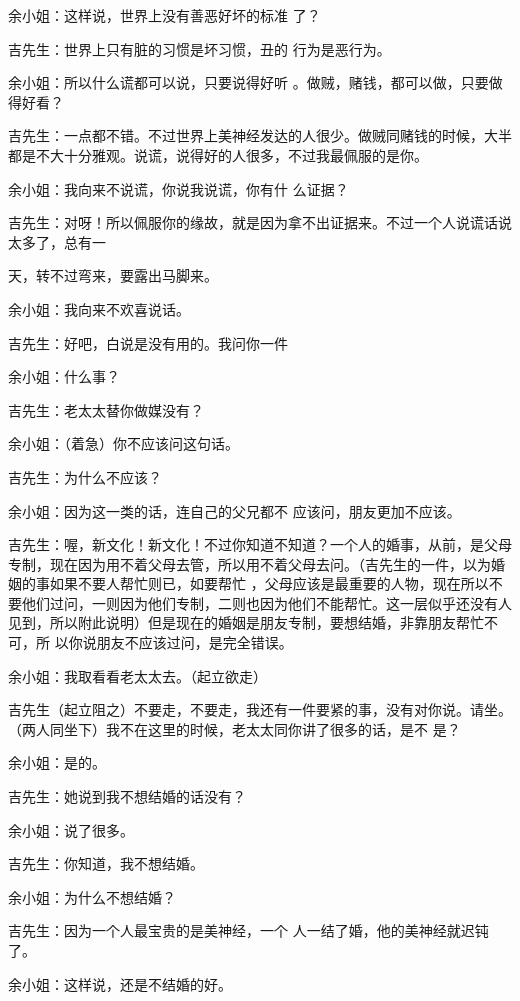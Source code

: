 \documentclass{article}
\begin{document}
余小姐：这样说，世界上没有善恶好坏的标准
了？ 

吉先生：世界上只有脏的习惯是坏习惯，丑的
行为是恶行为。 

余小姐：所以什么谎都可以说，只要说得好听
。做贼，赌钱，都可以做，只要做得好看？ 

吉先生：一点都不错。不过世界上美神经发达的人很少。做贼同赌钱的时候，大半都是不大十分雅观。说谎，说得好的人很多，不过我最佩服的是你。

余小姐：我向来不说谎，你说我说谎，你有什
么证据？ 

吉先生：对呀！所以佩服你的缘故，就是因为拿不出证据来。不过一个人说谎话说太多了，总有一
\newpage

天，转不过弯来，要露出马脚来。 


余小姐：我向来不欢喜说话。 

吉先生：好吧，白说是没有用的。我问你一件


余小姐：什么事？ 


吉先生：老太太替你做媒没有？ 


余小姐：（着急）你不应该问这句话。 


吉先生：为什么不应该？ 

余小姐：因为这一类的话，连自己的父兄都不
应该问，朋友更加不应该。 

吉先生：喔，新文化！新文化！不过你知道不知道？一个人的婚事，从前，是父母专制，现在因为用不着父母去管，所以用不着父母去问。（吉先生的一件，以为婚姻的事如果不要人帮忙则已，如要帮忙
\newpage
，父母应该是最重要的人物，现在所以不要他们过问，一则因为他们专制，二则也因为他们不能帮忙。这一层似乎还没有人见到，所以附此说明）但是现在的婚姻是朋友专制，要想结婚，非靠朋友帮忙不可，所
以你说朋友不应该过问，是完全错误。 


余小姐：我取看看老太太去。（起立欲走） 

吉先生（起立阻之）不要走，不要走，我还有一件要紧的事，没有对你说。请坐。（两人同坐下）我不在这里的时候，老太太同你讲了很多的话，是不
是？ 


余小姐：是的。 


吉先生：她说到我不想结婚的话没有？ 


余小姐：说了很多。 


吉先生：你知道，我不想结婚。 

\newpage


余小姐：为什么不想结婚？ 

吉先生：因为一个人最宝贵的是美神经，一个
人一结了婚，他的美神经就迟钝了。 


余小姐：这样说，还是不结婚的好。 
\end{document}
